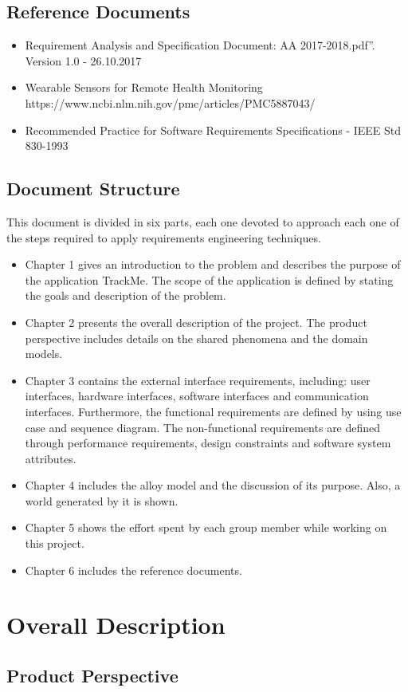 \documentclass[12pt]{article}
\begin{document}
\subsection{Reference Documents}
\begin{itemize}
\item Requirement Analysis and Specification Document: AA 2017-2018.pdf”. Version 1.0 - 26.10.2017
\item Wearable Sensors for Remote Health Monitoring
\\https://www.ncbi.nlm.nih.gov/pmc/articles/PMC5887043/
\item Recommended Practice for Software Requirements Specifications - IEEE Std 830-1993


\end{itemize}
\subsection{Document Structure}
This document is divided in six parts, each one devoted to approach each one of the steps required to apply requirements engineering techniques.\\
\begin{itemize}
\item Chapter 1 gives an introduction to the problem and describes the purpose of the application TrackMe. The scope of the application is defined by stating the goals and description of the problem.
\item Chapter 2 presents the overall description of the project. The product perspective includes details on the shared phenomena and the domain models.
\item Chapter 3 contains the external interface requirements, including: user interfaces, hardware interfaces, software interfaces and communication interfaces. Furthermore, the functional requirements are defined by using use case and sequence diagram. The non-functional requirements are defined through performance requirements, design constraints and software system attributes.
\item Chapter 4 includes the alloy model and the discussion of its purpose. Also, a world generated by it is shown.
\item Chapter 5 shows the effort spent by each group member while working on this project.
\item Chapter 6 includes the reference documents.

\end{itemize}

\section{Overall Description}
\subsection{Product Perspective}
\end{document}
